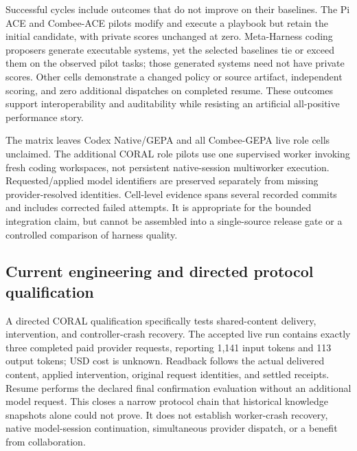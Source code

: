 

Successful cycles include outcomes that do not improve on their baselines. The Pi ACE and Combee-ACE pilots modify and execute a playbook but retain the initial candidate, with private scores unchanged at zero. Meta-Harness coding proposers generate executable systems, yet the selected baselines tie or exceed them on the observed pilot tasks; those generated systems need not have private scores. Other cells demonstrate a changed policy or source artifact, independent scoring, and zero additional dispatches on completed resume. These outcomes support interoperability and auditability while resisting an artificial all-positive performance story.

The matrix leaves Codex Native/GEPA and all Combee-GEPA live role cells unclaimed. The additional CORAL role pilots use one supervised worker invoking fresh coding workspaces, not persistent native-session multiworker execution. Requested/applied model identifiers are preserved separately from missing provider-resolved identities. Cell-level evidence spans several recorded commits and includes corrected failed attempts. It is appropriate for the bounded integration claim, but cannot be assembled into a single-source release gate or a controlled comparison of harness quality.

\subsection{Current engineering and directed protocol qualification}
A directed CORAL qualification specifically tests shared-content delivery, intervention, and controller-crash recovery. The accepted live run contains exactly three completed paid provider requests, reporting 1,141 input tokens and 113 output tokens; USD cost is unknown. Readback follows the actual delivered content, applied intervention, original request identities, and settled receipts. Resume performs the declared final confirmation evaluation without an additional model request. This closes a narrow protocol chain that historical knowledge snapshots alone could not prove. It does not establish worker-crash recovery, native model-session continuation, simultaneous provider dispatch, or a benefit from collaboration.

